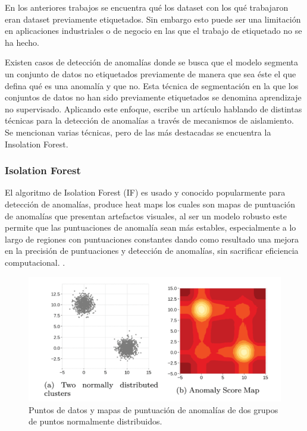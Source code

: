 \documentclass[11pt,a4paper,spanish]{book}
\numberwithin{equation}{chapter}
\numberwithin{figure}{chapter}
\begin{document}
En los anteriores trabajos se encuentra qué los dataset con los qué trabajaron eran dataset previamente etiquetados. Sin embargo esto puede ser una limitación en aplicaciones industriales o de negocio en las que el trabajo de etiquetado no se ha hecho.


Existen casos de detección de anomalías donde se busca que el modelo segmenta un conjunto de datos no etiquetados previamente de manera que sea éste el que defina qué es una anomalía y que no. Esta técnica de segmentación en la que los conjuntos de datos no han sido previamente etiquetados se denomina aprendizaje no supervisado. Aplicando este enfoque,  \cite{Cao_2025} escribe un artículo hablando de distintas técnicas para la detección de anomalías a través de mecanismos de aislamiento. Se mencionan varias técnicas, pero de las más destacadas se encuentra la Insolation Forest.


\subsubsection{Isolation Forest}

El algoritmo de Isolation Forest (IF) es usado y conocido popularmente para detección de anomalías, produce heat maps los cuales son mapas de puntuación de anomalías que presentan artefactos visuales, al ser un modelo robusto este permite que las puntuaciones de anomalía sean más estables, especialmente a lo largo de regiones con puntuaciones constantes dando como resultado una mejora en la precisión de puntuaciones y detección de anomalías, sin sacrificar eficiencia computacional. \cite{liu2021isoletionforest}.

\begin{figure}[h]
    \centering
    \includegraphics[width=1.0\textwidth]{media/liu-isolation-forest.png}
    \caption{Puntos de datos y mapas de puntuación de anomalías de dos grupos de puntos normalmente distribuidos.  \protect\cite{liu2021isoletionforest} }
    \label{fig:figIsolationForest}
\end{figure}
\end{document}
